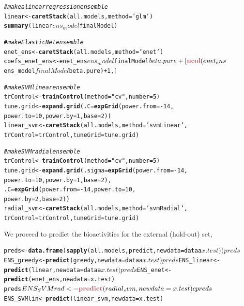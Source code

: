 \documentclass[twoside,a4wide,12pt]{article}\usepackage[]{graphicx}\usepackage[]{color}
\makeatletter
\newcommand{\hlstr}[1]{\textcolor[rgb]{0.192,0.494,0.8}{#1}}%
\newcommand{\hlcom}[1]{\textcolor[rgb]{0.678,0.584,0.686}{\textit{#1}}}%
\newcommand{\hlkwd}[1]{\textcolor[rgb]{0.737,0.353,0.396}{\textbf{#1}}}%
\newenvironment{kframe}{%
 \def\at@end@of@kframe{}%
 \ifinner\ifhmode%
  \def\at@end@of@kframe{\end{minipage}}%
  \begin{minipage}{\columnwidth}%
 \fi\fi%
 \def\FrameCommand##1{\hskip\@totalleftmargin \hskip-\fboxsep
 \colorbox{shadecolor}{##1}\hskip-\fboxsep
     \hskip-\linewidth \hskip-\@totalleftmargin \hskip\columnwidth}%
 \MakeFramed {\advance\hsize-\width
   \@totalleftmargin\z@ \linewidth\hsize
   \@setminipage}}%
 {\par\unskip\endMakeFramed%
 \at@end@of@kframe}
\newenvironment{knitrout}{}{} %
\makeatother
\begin{document}
\begin{knitrout}
\color{fgcolor}\begin{kframe}
\begin{alltt}
\hlcom{  # make a linear regression ensemble}
  linear <- \hlkwd{caretStack}(all.models, method=\hlstr{'glm'})
\hlkwd{summary}(linear$ens_model$finalModel)

\hlcom{# make Elastic Net ensemble}
enet_ens <- \hlkwd{caretStack}(all.models, method=\hlstr{'enet'})
coefs_enet_ens <- enet_ens$ens_model$finalModel$beta.pure +
[\hlkwd{ncol}(enet_ens$ens_model$finalModel$beta.pure)+1,]

\hlcom{# make SVM linear ensemble}
trControl <- \hlkwd{trainControl}(method = \hlstr{"cv"},  number=5)
tune.grid <- \hlkwd{expand.grid}(.C=\hlkwd{expGrid}(power.from=-14,
                                    power.to=10,power.by=1,base=2))
linear_svm <- \hlkwd{caretStack}(all.models, method=\hlstr{'svmLinear'},
                         trControl=trControl,tuneGrid=tune.grid)

\hlcom{# make SVM radial ensemble}
trControl <- \hlkwd{trainControl}(method = \hlstr{"cv"},  number=5)
tune.grid <- \hlkwd{expand.grid}(.sigma=\hlkwd{expGrid}(power.from=-14,
                                        power.to=10,power.by=1,base=2),
                         .C=\hlkwd{expGrid}(power.from=-14,power.to=10,
                                    power.by=2,base=2))
radial_svm <- \hlkwd{caretStack}(all.models, method=\hlstr{'svmRadial'},
                         trControl=trControl,tuneGrid=tune.grid)
\end{alltt}
\end{kframe}
\end{knitrout}
We proceed to predict the bioactivities for the external (hold-out) set,
\begin{knitrout}
\color{fgcolor}\begin{kframe}
\begin{alltt}
preds <- \hlkwd{data.frame}(\hlkwd{sapply}(all.models, predict, newdata=dataa$x.test))
preds$ENS_greedy <- \hlkwd{predict}(greedy, newdata=dataa$x.test)
preds$ENS_linear <- \hlkwd{predict}(linear, newdata=dataa$x.test)
preds$ENS_enet <- \hlkwd{predict}(enet_ens, newdata=x.test)
preds$ENS_SVMrad <- \hlkwd{predict}(radial_svm, newdata=x.test)c
preds$ENS_SVMlin <- \hlkwd{predict}(linear_svm, newdata=x.test)
\end{alltt}
\end{kframe}
\end{knitrout}
\end{document}
